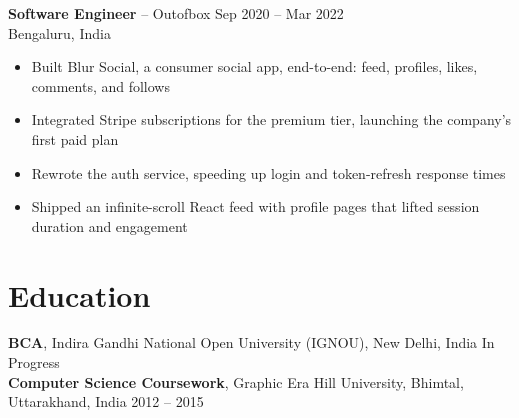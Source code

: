 \documentclass[11pt, a4paper]{article}
\newcommand{\roleheader}[4]{%
    \textbf{#1} -- #3 \hfill #2\\
    {\color{mediumtext}#4}%
}
\begin{document}
\roleheader{Software Engineer}{Sep 2020 -- Mar 2022}{Outofbox}{Bengaluru, India}
\begin{itemize}
    \item Built Blur Social, a consumer social app, end-to-end: feed, profiles, likes, comments, and follows
    \item Integrated Stripe subscriptions for the premium tier, launching the company's first paid plan
    \item Rewrote the auth service, speeding up login and token-refresh response times
    \item Shipped an infinite-scroll React feed with profile pages that lifted session duration and engagement
\end{itemize}

\section*{Education}
\textbf{BCA}, Indira Gandhi National Open University (IGNOU), New Delhi, India \hfill In Progress\\[2pt]
\textbf{Computer Science Coursework}, Graphic Era Hill University, Bhimtal, Uttarakhand, India \hfill 2012 -- 2015
\end{document}
